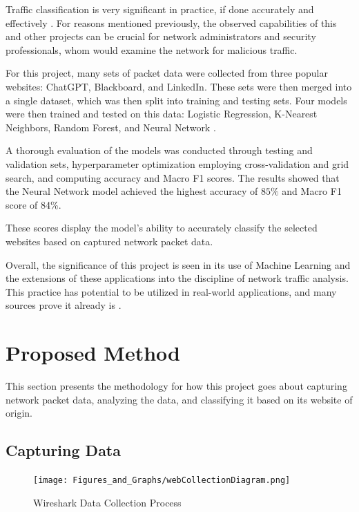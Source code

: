 \documentclass[10pt,sigconf,letterpaper,nonacm]{acmart}
\begin{document}
  Traffic classification is very significant in practice, if done accurately and effectively \cite{10.1109/TNET.2014.2320577}. For reasons mentioned previously, the observed capabilities of this and other projects 
  can be crucial for network administrators and security professionals, whom would examine the network for malicious traffic.

  For this project, many sets of packet data were collected from three popular websites: ChatGPT, Blackboard, and LinkedIn. These sets were then merged into a single dataset, which was then split into training and testing sets. 
  Four models were then trained and tested on this data: Logistic Regression, K-Nearest Neighbors, Random Forest, and Neural Network \cite{scikit-learn}. 

  A thorough evaluation of the models was conducted through testing and validation sets, hyperparameter optimization employing cross-validation and grid search, and computing accuracy and Macro F1 scores. The results showed that the Neural Network model 
  achieved the highest accuracy of $85\%$ and Macro F1 score of 84\%.

  These scores display the model's ability to accurately classify the selected websites based on captured network packet data.

  Overall, the significance of this project is seen in its use of Machine Learning and the extensions of these applications into the discipline of network traffic analysis. This practice has potential to be utilized in real-world applications, and many sources
  prove it already is \cite{10.5555/3432601.3432608}. 

\section{Proposed Method}
This section presents the methodology for how this project goes about capturing network packet data, analyzing the data, and classifying it based on its website of origin.

\subsection{Capturing Data}

\begin{figure}[t]
  \centering
  \texttt{[image: Figures\_and\_Graphs/webCollectionDiagram.png]}
  \caption{Wireshark Data Collection Process}
  \label{fig:dataCollection}
\end{figure}
\end{document}
